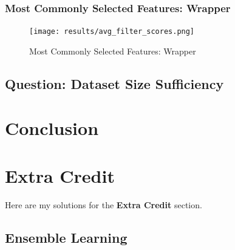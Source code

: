 \documentclass[12pt,twoside,a4paper]{article}
\begin{document}
\subsubsection*{Most Commonly Selected Features: Wrapper}

\begin{figure}[H]
    \centering
    \texttt{[image: results/avg\_filter\_scores.png]}
    \caption{Most Commonly Selected Features: Wrapper}
    \label{fig: FW7}
\end{figure}

\subsection{Question: Dataset Size Sufficiency}

\section{Conclusion}

\section{Extra Credit}
Here are my solutions for the \textbf{Extra Credit} section.
\subsection{Ensemble Learning}


{\small

}
\end{document}
